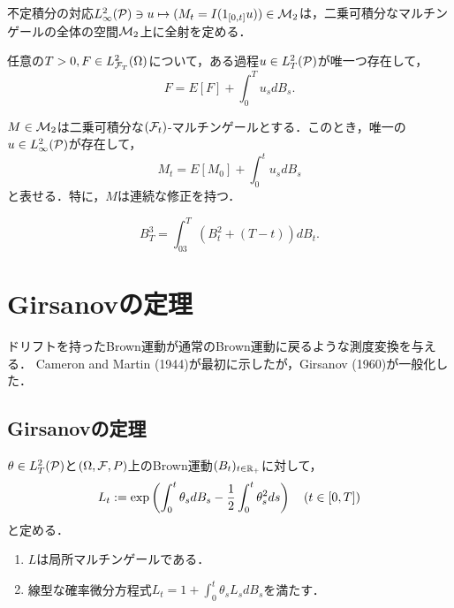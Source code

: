 \documentclass[uplatex,dvipdfmx]{jsreport}
\begin{document}
\begin{tcolorbox}[colframe=ForestGreen, colback=ForestGreen!10!white,breakable,colbacktitle=ForestGreen!40!white,coltitle=black,fonttitle=\bfseries\sffamily,
title=]
    不定積分の対応$L^2_\infty(\P)\ni u\mapsto(M_t=I(1_{[0,t]}u))\in\M_2$は，二乗可積分なマルチンゲールの全体の空間$\M_2$上に全射を定める．
\end{tcolorbox}

\begin{theorem}
    任意の$T>0, F\in L^2_{\F_T}(\Om)$について，ある過程$u\in L^2_T(\P)$が唯一つ存在して，
    \[F=E[F]+\int^T_0u_sdB_s.\]
\end{theorem}

\begin{corollary}
    $M\in\M_2$は二乗可積分な$(\F_t)$-マルチンゲールとする．このとき，唯一の$u\in L^2_\infty(\P)$が存在して，
    \[M_t=E[M_0]+\int^t_0u_sdB_s\]
    と表せる．特に，$M$は連続な修正を持つ．
\end{corollary}

\begin{example}
    \[B^3_T=\int^T_03(B_t^2+(T-t))dB_t.\]
\end{example}

\section{Girsanovの定理}

\begin{tcolorbox}[colframe=ForestGreen, colback=ForestGreen!10!white,breakable,colbacktitle=ForestGreen!40!white,coltitle=black,fonttitle=\bfseries\sffamily,
title=]
    ドリフトを持ったBrown運動が通常のBrown運動に戻るような測度変換を与える．
    Cameron and Martin (1944)が最初に示したが，Girsanov (1960)が一般化した．
\end{tcolorbox}

\subsection{Girsanovの定理}

\begin{lemma}
    $\theta\in L^2_T(\P)$と$(\Om,\F,P)$上のBrown運動$(B_t)_{t\in\R_+}$に対して，
    \[L_t:=\exp\paren{\int^t_0\theta_sdB_s-\frac{1}{2}\int^t_0\theta^2_sds}\quad(t\in[0,T])\]
    と定める．
    \begin{enumerate}
        \item $L$は局所マルチンゲールである．
        \item 線型な確率微分方程式$L_t=1+\int^t_0\theta_sL_sdB_s$を満たす．
    \end{enumerate}
\end{lemma}
\end{document}
